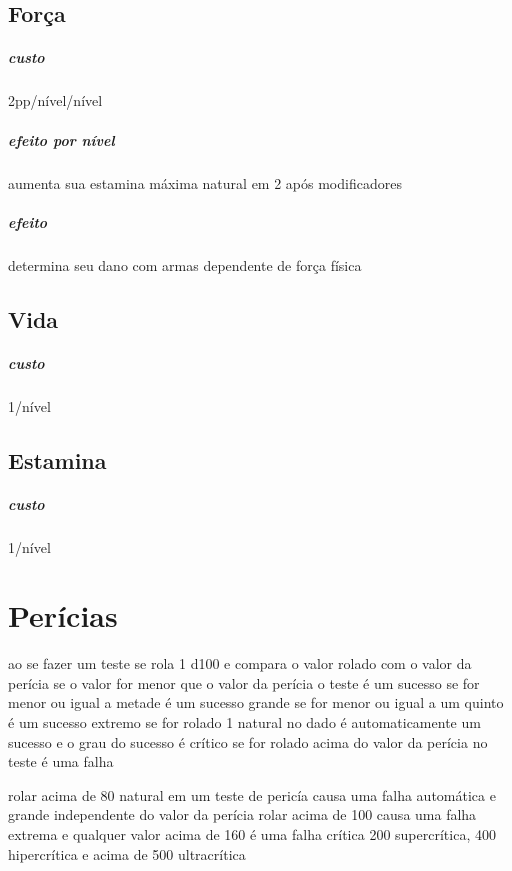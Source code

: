 \section{Força}
\paragraph{custo} 2pp/nível/nível
\paragraph{efeito por nível} aumenta sua estamina máxima natural em 2 após modificadores
\paragraph{efeito} determina seu dano com armas dependente de força física
%
%
\section{Vida}
\paragraph{custo} 1/nível
%
%
\section{Estamina}
\paragraph{custo} 1/nível 
%
%
%
%
\clearpage{}
\chapter{Perícias}
ao se fazer um teste se rola 1 d100 e compara o valor rolado com o valor da perícia
se o valor for menor que o valor da perícia o teste é um sucesso
se for menor ou igual a metade é um sucesso grande
se for menor ou igual a um quinto é um sucesso extremo
se for rolado 1 natural no dado é automaticamente um sucesso e o grau do sucesso é crítico
se for rolado acima do valor da perícia no teste é uma falha

rolar acima de 80 natural em um teste de pericía causa uma falha automática e grande independente do valor da perícia
rolar acima de 100 causa uma falha extrema e qualquer valor acima de 160 é uma falha crítica 
200 supercrítica, 400 hipercrítica e acima de 500 ultracrítica

